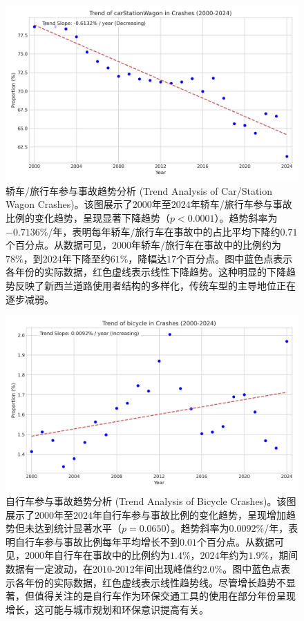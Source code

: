 \documentclass[12pt,a4paper]{article}
\begin{document}
\begin{figure}[H]
\centering
\includegraphics[height=0.3\textheight]{trend_carStationWagon.png}
\caption{轿车/旅行车参与事故趋势分析 (Trend Analysis of Car/Station Wagon Crashes)。该图展示了$2000$年至$2024$年轿车/旅行车参与事故比例的变化趋势，呈现显著下降趋势（$p < 0.0001$）。趋势斜率为$-0.7136\%$/年，表明每年轿车/旅行车在事故中的占比平均下降约$0.71$个百分点。从数据可见，$2000$年轿车/旅行车在事故中的比例约为$78\%$，到$2024$年下降至约$61\%$，降幅达$17$个百分点。图中蓝色点表示各年份的实际数据，红色虚线表示线性下降趋势。这种明显的下降趋势反映了新西兰道路使用者结构的多样化，传统车型的主导地位正在逐步减弱。}
\label{fig:trend_carStationWagon}
\end{figure}

\begin{figure}[H]
\centering
\includegraphics[height=0.3\textheight]{trend_bicycle.png}
\caption{自行车参与事故趋势分析 (Trend Analysis of Bicycle Crashes)。该图展示了$2000$年至$2024$年自行车参与事故比例的变化趋势，呈现增加趋势但未达到统计显著水平（$p = 0.0650$）。趋势斜率为$0.0092\%$/年，表明自行车参与事故比例每年平均增长不到$0.01$个百分点。从数据可见，$2000$年自行车在事故中的比例约为$1.4\%$，$2024$年约为$1.9\%$，期间数据有一定波动，在$2010$-$2012$年间出现峰值约$2.0\%$。图中蓝色点表示各年份的实际数据，红色虚线表示线性趋势线。尽管增长趋势不显著，但值得关注的是自行车作为环保交通工具的使用在部分年份呈现增长，这可能与城市规划和环保意识提高有关。}
\label{fig:trend_bicycle}
\end{figure}
\end{document}
